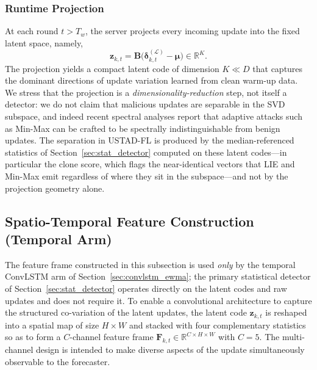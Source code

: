 \documentclass[journal]{IEEEtran}
\begin{document}
\subsubsection{Runtime Projection}
At each round $t > T_w$, the server projects every incoming update into the fixed latent space, namely,
\begin{equation}
\mathbf{z}_{k,t} = \mathbf{B}\bigl(\boldsymbol{\delta}_{k,t}^{(\mathcal{L})} - \boldsymbol{\mu}\bigr) \in \mathbb{R}^K.
\label{eq:projection}
\end{equation}
The projection yields a compact latent code of dimension $K \ll D$ that captures the dominant directions of update variation learned from clean warm-up data. We stress that the projection is a \emph{dimensionality-reduction} step, not itself a detector: we do not claim that malicious updates are separable in the SVD subspace, and indeed recent spectral analyses report that adaptive attacks such as Min-Max can be crafted to be spectrally indistinguishable from benign updates. The separation in USTAD-FL is produced by the median-referenced statistics of Section~\ref{sec:stat_detector} computed on these latent codes---in particular the clone score, which flags the near-identical vectors that LIE and Min-Max emit regardless of where they sit in the subspace---and not by the projection geometry alone.

\subsection{Spatio-Temporal Feature Construction (Temporal Arm)}
\label{sec:frame}

The feature frame constructed in this subsection is used \emph{only} by the temporal ConvLSTM arm of Section~\ref{sec:convlstm_ewma}; the primary statistical detector of Section~\ref{sec:stat_detector} operates directly on the latent codes and raw updates and does not require it. To enable a convolutional architecture to capture the structured co-variation of the latent updates, the latent code $\mathbf{z}_{k,t}$ is reshaped into a spatial map of size $H \times W$ and stacked with four complementary statistics so as to form a $C$-channel feature frame $\mathbf{F}_{k,t} \in \mathbb{R}^{C \times H \times W}$ with $C = 5$. The multi-channel design is intended to make diverse aspects of the update simultaneously observable to the forecaster.
\end{document}
